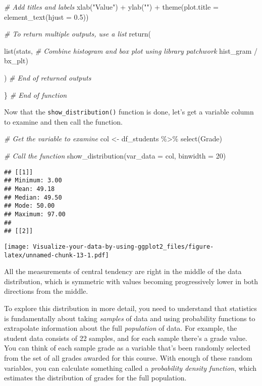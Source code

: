 \documentclass[
]{article}
\newenvironment{Shaded}{\begin{snugshade}}{\end{snugshade}}
\newcommand{\AttributeTok}[1]{\textcolor[rgb]{0.77,0.63,0.00}{#1}}
\newcommand{\CommentTok}[1]{\textcolor[rgb]{0.56,0.35,0.01}{\textit{#1}}}
\newcommand{\DecValTok}[1]{\textcolor[rgb]{0.00,0.00,0.81}{#1}}
\newcommand{\FloatTok}[1]{\textcolor[rgb]{0.00,0.00,0.81}{#1}}
\newcommand{\FunctionTok}[1]{\textcolor[rgb]{0.00,0.00,0.00}{#1}}
\newcommand{\NormalTok}[1]{#1}
\newcommand{\OtherTok}[1]{\textcolor[rgb]{0.56,0.35,0.01}{#1}}
\newcommand{\SpecialCharTok}[1]{\textcolor[rgb]{0.00,0.00,0.00}{#1}}
\newcommand{\StringTok}[1]{\textcolor[rgb]{0.31,0.60,0.02}{#1}}
\begin{document}
\begin{Shaded}
\begin{Highlighting}[]
    \CommentTok{\# Add titles and labels}
  \FunctionTok{xlab}\NormalTok{(}\StringTok{"Value"}\NormalTok{) }\SpecialCharTok{+}
  \FunctionTok{ylab}\NormalTok{(}\StringTok{""}\NormalTok{) }\SpecialCharTok{+}
  \FunctionTok{theme}\NormalTok{(}\AttributeTok{plot.title =} \FunctionTok{element\_text}\NormalTok{(}\AttributeTok{hjust =} \FloatTok{0.5}\NormalTok{))}
  
  
  \CommentTok{\# To return multiple outputs, use a list}
  \FunctionTok{return}\NormalTok{(}
    
    \FunctionTok{list}\NormalTok{(stats,}
         \CommentTok{\# Combine histogram and box plot using library patchwork}
\NormalTok{         hist\_gram }\SpecialCharTok{/}\NormalTok{ bx\_plt)}
    
\NormalTok{        ) }\CommentTok{\# End of returned outputs}
  
\NormalTok{\} }\CommentTok{\# End of function}
\end{Highlighting}
\end{Shaded}

Now that the \texttt{show\_distribution()} function is done, let's get a
variable column to examine and then call the function.

\begin{Shaded}
\begin{Highlighting}[]
\CommentTok{\# Get the variable to examine}
\NormalTok{col }\OtherTok{\textless{}{-}}\NormalTok{ df\_students }\SpecialCharTok{\%\textgreater{}\%} 
  \FunctionTok{select}\NormalTok{(Grade)}

\CommentTok{\# Call the function}
\FunctionTok{show\_distribution}\NormalTok{(}\AttributeTok{var\_data =}\NormalTok{ col, }\AttributeTok{binwidth =} \DecValTok{20}\NormalTok{)}
\end{Highlighting}
\end{Shaded}

\begin{verbatim}
## [[1]]
## Minimum: 3.00
## Mean: 49.18
## Median: 49.50
## Mode: 50.00
## Maximum: 97.00
## 
## [[2]]
\end{verbatim}

\texttt{[image: Visualize-your-data-by-using-ggplot2\_files/figure-latex/unnamed-chunk-13-1.pdf]}

All the measurements of central tendency are right in the middle of the
data distribution, which is symmetric with values becoming progressively
lower in both directions from the middle.

To explore this distribution in more detail, you need to understand that
statistics is fundamentally about taking \emph{samples} of data and
using probability functions to extrapolate information about the full
\emph{population} of data. For example, the student data consists of 22
samples, and for each sample there's a grade value. You can think of
each sample grade as a variable that's been randomly selected from the
set of all grades awarded for this course. With enough of these random
variables, you can calculate something called a \emph{probability
density function}, which estimates the distribution of grades for the
full population.
\end{document}
